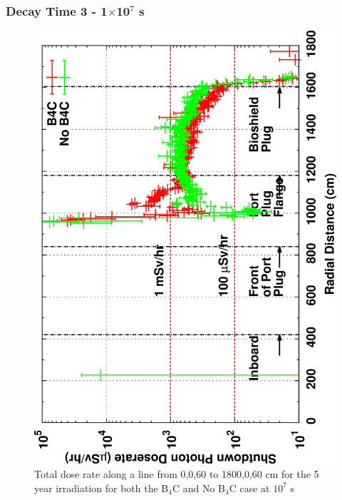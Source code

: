 \documentclass[12pt]{article}
\begin{document}
\subsubsection{Decay Time 3 - 1$\times$10$^{7}$ s}
\begin{figure}[ht!]
\centering
\includegraphics[clip,scale=0.12,angle=-90]{../plots/photon_lineout/comp/5yr_dc3.png}
\caption{Total dose rate along a line from 0,0,60 to 1800,0,60 cm for the 5 year irradiation
for both the B$_4$C and No B$_4$C case at $10^7$ s}
\label{fig:photons_5y_dc3_dose}
\end{figure}
\end{document}
